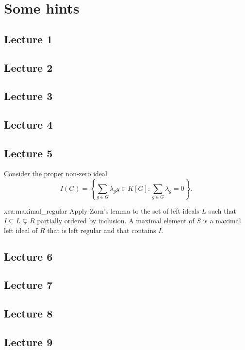 \chapter[Some hints]{Some hints}

\section*{Lecture 1}
\section*{Lecture 2}
\section*{Lecture 3}
\section*{Lecture 4}
\section*{Lecture 5}

Consider the proper non-zero ideal 
\[
	I(G)=\left\{\sum_{g\in G}\lambda_gg\in K[G]:\sum_{g\in G}\lambda_g=0\right\}.
\]

\begin{sol}{xca:maximal_regular}
    Apply Zorn's lemma to the set of left ideals $L$ such that $I\subseteq L\subsetneq R$
    partially ordered by inclusion. A maximal element of $S$ is a maximal left ideal of $R$
    that is left regular and 
    that contains $I$. 
\end{sol}

\section*{Lecture 6}
\section*{Lecture 7}
\section*{Lecture 8}
\section*{Lecture 9}
